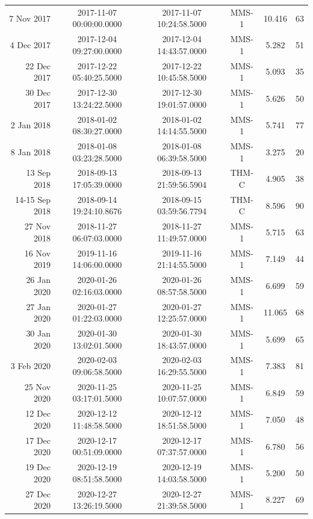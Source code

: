 \begin{longtable}{r|ccccc}
7 Nov 2017     &  2017-11-07 00:00:00.0000 &  2017-11-07 10:24:58.5000 &  MMS-1 &   10.416 &     63 \\
4 Dec 2017     &  2017-12-04 09:27:00.0000 &  2017-12-04 14:43:57.0000 &  MMS-1 &    5.282 &     51 \\
22 Dec 2017    &  2017-12-22 05:40:25.5000 &  2017-12-22 10:45:58.5000 &  MMS-1 &    5.093 &     35 \\
30 Dec 2017    &  2017-12-30 13:24:22.5000 &  2017-12-30 19:01:57.0000 &  MMS-1 &    5.626 &     50 \\
2 Jan 2018     &  2018-01-02 08:30:27.0000 &  2018-01-02 14:14:55.5000 &  MMS-1 &    5.741 &     77 \\
8 Jan 2018     &  2018-01-08 03:23:28.5000 &  2018-01-08 06:39:58.5000 &  MMS-1 &    3.275 &     20 \\
13 Sep 2018    &  2018-09-13 17:05:39.0000 &  2018-09-13 21:59:56.5904 &  THM-C &    4.905 &     38 \\
14-15 Sep 2018 &  2018-09-14 19:24:10.8676 &  2018-09-15 03:59:56.7794 &  THM-C &    8.596 &     90 \\
27 Nov 2018    &  2018-11-27 06:07:03.0000 &  2018-11-27 11:49:57.0000 &  MMS-1 &    5.715 &     63 \\
16 Nov 2019    &  2019-11-16 14:06:00.0000 &  2019-11-16 21:14:55.5000 &  MMS-1 &    7.149 &     44 \\
26 Jan 2020    &  2020-01-26 02:16:03.0000 &  2020-01-26 08:57:58.5000 &  MMS-1 &    6.699 &     59 \\
27 Jan 2020    &  2020-01-27 01:22:03.0000 &  2020-01-27 12:25:57.0000 &  MMS-1 &   11.065 &     68 \\
30 Jan 2020    &  2020-01-30 13:02:01.5000 &  2020-01-30 18:43:57.0000 &  MMS-1 &    5.699 &     65 \\
3 Feb 2020     &  2020-02-03 09:06:58.5000 &  2020-02-03 16:29:55.5000 &  MMS-1 &    7.383 &     81 \\
25 Nov 2020    &  2020-11-25 03:17:01.5000 &  2020-11-25 10:07:57.0000 &  MMS-1 &    6.849 &     59 \\
12 Dec 2020    &  2020-12-12 11:48:58.5000 &  2020-12-12 18:51:58.5000 &  MMS-1 &    7.050 &     48 \\
17 Dec 2020    &  2020-12-17 00:51:09.0000 &  2020-12-17 07:37:57.0000 &  MMS-1 &    6.780 &     56 \\
19 Dec 2020    &  2020-12-19 08:51:58.5000 &  2020-12-19 14:03:58.5000 &  MMS-1 &    5.200 &     50 \\
27 Dec 2020    &  2020-12-27 13:26:19.5000 &  2020-12-27 21:39:58.5000 &  MMS-1 &    8.227 &     69 \\

\end{longtable}

